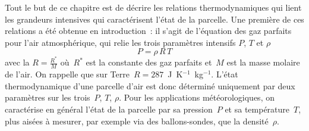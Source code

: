 
\sk
Tout le but de ce chapitre est de décrire les relations thermodynamiques qui lient les grandeurs intensives qui caractérisent l'état de la parcelle. Une première de ces relations a été obtenue en introduction~: il s'agit de l'équation des gaz parfaits pour l'air atmosphérique, qui relie les trois paramètres intensifs $P$, $T$ et $\rho$ 
\[ \boxed{ P = \rho \, R \,T } \] 
avec la  $R=\frac{R^*}{M}$ où~$R^*$ est la constante des gaz parfaits et~$M$ est la masse molaire de l'air. On rappelle que sur Terre~$R = 287$~J~K$^{-1}$~kg$^{-1}$. L'état thermodynamique d'une parcelle d'air est donc déterminé uniquement par deux paramètres sur les trois~$P$, $T$, $\rho$. Pour les applications météorologiques, on caractérise en général l'état de la parcelle par sa pression~$P$ et sa température~$T$, plus aisées à mesurer, par exemple via des ballons-sondes, que la densité~$\rho$.

